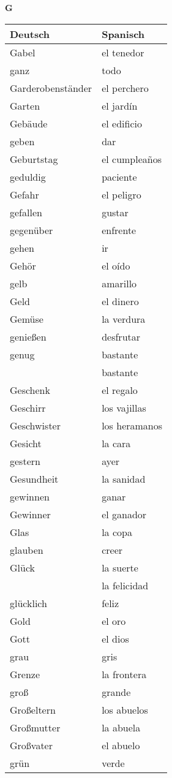 \begin{flushright}\begin{Huge}\textbf{G}\end{Huge}\end{flushright}

\begin{longtable}{p{} p{}} 
\textbf{Deutsch}     & \textbf{Spanisch}                                       \\ \hline
\hline
\endhead %
Gabel & el tenedor\\
ganz & todo\\
Garderobenständer & el perchero\\
Garten & el jardín\\
Gebäude & el edificio\\
geben & dar\\
Geburtstag & el cumpleaños\\
geduldig & paciente\\
Gefahr & el peligro\\
gefallen & gustar\\
gegenüber & enfrente\\
gehen & ir\\
Gehör & el oído\\
gelb & amarillo \\
Geld & el dinero\\
Gemüse & la verdura\\
genießen & desfrutar\\
genug & bastante\\
~ & bastante\\
Geschenk & el regalo\\
Geschirr & los vajillas\\
Geschwister & los heramanos \\
Gesicht & la cara\\
gestern & ayer\\
Gesundheit & la sanidad\\
gewinnen & ganar\\
Gewinner & el ganador\\
Glas & la copa\\
glauben & creer\\
Glück & la suerte \\
~ & la felicidad \\
glücklich & feliz\\
Gold & el oro\\
Gott & el dios\\
grau & gris \\
Grenze & la frontera\\
groß & grande\\
Großeltern & los abuelos\\
Großmutter & la abuela\\
Großvater & el abuelo\\
grün & verde\\

\end{longtable}
